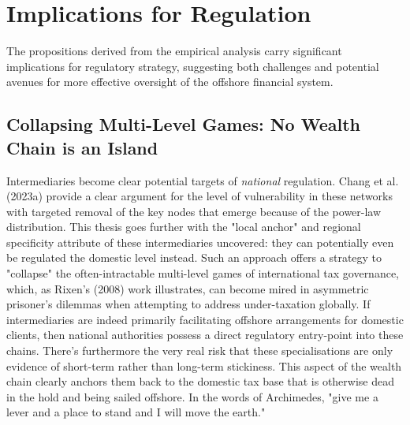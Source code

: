 \section{Implications for Regulation}
\label{sec:implications_regulation}

The propositions derived from the empirical analysis carry significant implications for regulatory strategy, suggesting both challenges and potential avenues for more effective oversight of the offshore financial system. 

\subsection{Collapsing Multi-Level Games: No Wealth Chain is an Island}
\label{subsec:collapsing_games_chokepoints}

Intermediaries become clear potential targets of \textit{national} regulation. Chang et al. (2023a) provide a clear argument for the level of vulnerability in these networks with targeted removal of the key nodes that emerge because of the power-law distribution. This thesis goes further with the "local anchor" and regional specificity attribute of these intermediaries uncovered: they can potentially even be regulated the domestic level instead. Such an approach offers a strategy to "collapse" the often-intractable multi-level games of international tax governance, which, as Rixen's (2008) work illustrates, can become mired in asymmetric prisoner's dilemmas when attempting to address under-taxation globally. If intermediaries are indeed primarily facilitating offshore arrangements for domestic clients, then national authorities possess a direct regulatory entry-point into these chains. There's furthermore the very real risk that these specialisations are only evidence of short-term rather than long-term stickiness. This aspect of the wealth chain clearly anchors them back to the domestic tax base that is otherwise dead in the hold and being sailed offshore. In the words of Archimedes, "give me a lever and a place to stand and I will move the earth."


